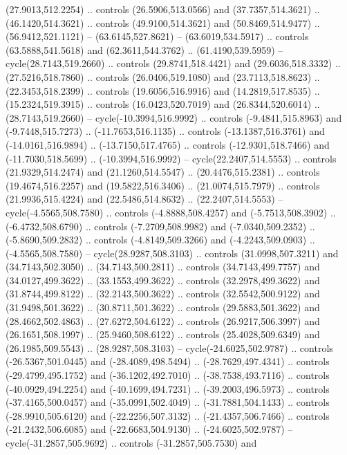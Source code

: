 \begin{scope}[shift={(58.28571,-442.36218)}]
    (27.9013,512.2254) .. controls (26.5906,513.0566) and (37.7357,514.3621) ..
    (46.1420,514.3621) .. controls (49.9100,514.3621) and (50.8469,514.9477) ..
    (56.9412,521.1121) -- (63.6145,527.8621) -- (63.6019,534.5917) .. controls
    (63.5888,541.5618) and (62.3611,544.3762) .. (61.4190,539.5959) --
    cycle(28.7143,519.2660) .. controls (29.8741,518.4421) and (29.6036,518.3332)
    .. (27.5216,518.7860) .. controls (26.0406,519.1080) and (23.7113,518.8623) ..
    (22.3453,518.2399) .. controls (19.6056,516.9916) and (14.2819,517.8535) ..
    (15.2324,519.3915) .. controls (16.0423,520.7019) and (26.8344,520.6014) ..
    (28.7143,519.2660) -- cycle(-10.3994,516.9992) .. controls (-9.4841,515.8963)
    and (-9.7448,515.7273) .. (-11.7653,516.1135) .. controls (-13.1387,516.3761)
    and (-14.0161,516.9894) .. (-13.7150,517.4765) .. controls (-12.9301,518.7466)
    and (-11.7030,518.5699) .. (-10.3994,516.9992) -- cycle(22.2407,514.5553) ..
    controls (21.9329,514.2474) and (21.1260,514.5547) .. (20.4476,515.2381) ..
    controls (19.4674,516.2257) and (19.5822,516.3406) .. (21.0074,515.7979) ..
    controls (21.9936,515.4224) and (22.5486,514.8632) .. (22.2407,514.5553) --
    cycle(-4.5565,508.7580) .. controls (-4.8888,508.4257) and (-5.7513,508.3902)
    .. (-6.4732,508.6790) .. controls (-7.2709,508.9982) and (-7.0340,509.2352) ..
    (-5.8690,509.2832) .. controls (-4.8149,509.3266) and (-4.2243,509.0903) ..
    (-4.5565,508.7580) -- cycle(28.9287,508.3103) .. controls (31.0998,507.3211)
    and (34.7143,502.3050) .. (34.7143,500.2811) .. controls (34.7143,499.7757)
    and (34.0127,499.3622) .. (33.1553,499.3622) .. controls (32.2978,499.3622)
    and (31.8744,499.8122) .. (32.2143,500.3622) .. controls (32.5542,500.9122)
    and (31.9498,501.3622) .. (30.8711,501.3622) .. controls (29.5883,501.3622)
    and (28.4662,502.4863) .. (27.6272,504.6122) .. controls (26.9217,506.3997)
    and (26.1651,508.1997) .. (25.9460,508.6122) .. controls (25.4028,509.6349)
    and (26.1985,509.5543) .. (28.9287,508.3103) -- cycle(-24.6025,502.9787) ..
    controls (-26.5367,501.0445) and (-28.4089,498.5494) .. (-28.7629,497.4341) ..
    controls (-29.4799,495.1752) and (-36.1202,492.7010) .. (-38.7538,493.7116) ..
    controls (-40.0929,494.2254) and (-40.1699,494.7231) .. (-39.2003,496.5973) ..
    controls (-37.4165,500.0457) and (-35.0991,502.4049) .. (-31.7881,504.1433) ..
    controls (-28.9910,505.6120) and (-22.2256,507.3132) .. (-21.4357,506.7466) ..
    controls (-21.2432,506.6085) and (-22.6683,504.9130) .. (-24.6025,502.9787) --
    cycle(-31.2857,505.9692) .. controls (-31.2857,505.7530) and

\end{scope}
